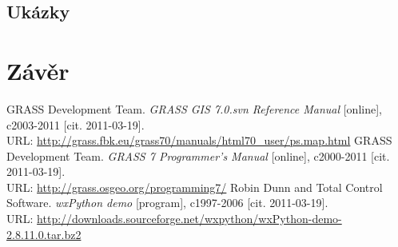 \documentclass[a4paper,12pt,draft]{article}
\begin{document}
 

\subsection{Ukázky}

\section{Závěr}

\begin{thebibliography}{9}
\label{literatura}
 GRASS Development Team. \textit{GRASS GIS 7.0.svn Reference Manual} [online], c2003-2011 [cit. 2011-03-19].\\ URL: \url{http://grass.fbk.eu/grass70/manuals/html70_user/ps.map.html}
 GRASS Development Team. \textit{GRASS 7 Programmer's Manual} [online], c2000-2011 [cit. 2011-03-19].\\ URL: \url{http://grass.osgeo.org/programming7/}
 Robin Dunn and Total Control Software. \textit{wxPython demo} [program], c1997-2006 [cit. 2011-03-19].\\ URL: \url{http://downloads.sourceforge.net/wxpython/wxPython-demo-2.8.11.0.tar.bz2}
\end{thebibliography}
\end{document}
